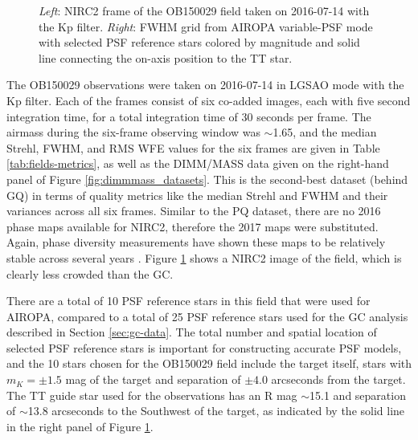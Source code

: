 \documentclass[]{spie}  %
\begin{document}
\begin{figure}[!h]
 \caption{\footnotesize \textit{Left}: NIRC2 frame of the OB150029 field taken on 2016-07-14 with the Kp filter. \textit{Right}: FWHM grid from AIROPA variable-PSF mode with selected PSF reference stars colored by magnitude and solid line connecting the on-axis position to the TT star.} \label{fig:ob150029}
\end{figure}

The OB150029 observations were taken on 2016-07-14 in LGSAO mode with the Kp filter. Each of the frames consist of six co-added images, each with five second integration time, for a total integration time of 30 seconds per frame. The airmass during the six-frame observing window was $\sim$1.65, and the median Strehl, FWHM, and RMS WFE values for the six frames are given in Table \ref{tab:fields-metrics}, as well as the DIMM/MASS data given on the right-hand panel of Figure \ref{fig:dimmmass_datasets}. This is the second-best dataset (behind GQ) in terms of quality metrics like the median Strehl and FWHM and their variances across all six frames. Similar to the PQ dataset, there are no 2016 phase maps available for NIRC2, therefore the 2017 maps were substituted. Again, phase diversity measurements have shown these maps to be relatively stable across several years \citep{Ciurlo:inprep}. Figure \ref{fig:ob150029} shows a NIRC2 image of the field, which is clearly less crowded than the GC. 

\indent There are a total of 10 PSF reference stars in this field that were used for AIROPA, compared to a total of 25 PSF reference stars used for the GC analysis described in Section \ref{sec:gc-data}. The total number and spatial location of selected PSF reference stars is important for constructing accurate PSF models, and the 10 stars chosen for the OB150029 field include the target itself, stars with $m_K = \pm 1.5$ mag of the target and separation of $\pm4.0$ arcseconds from the target. The TT guide star used for the observations has an R mag ${\sim}$15.1 and separation of ${\sim}$13.8 arcseconds to the Southwest of the target, as indicated by the solid line in the right panel of Figure \ref{fig:ob150029}.
\end{document}

